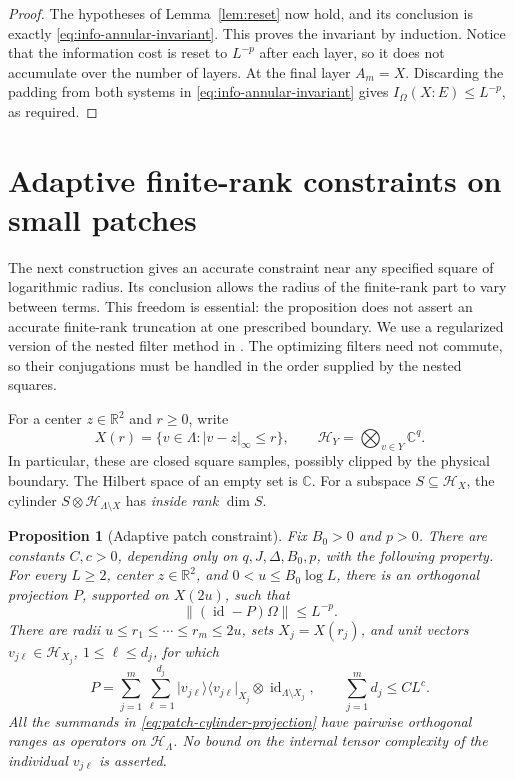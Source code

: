 \documentclass[11pt]{article}
\numberwithin{equation}{section}
\newtheorem{proposition}[theorem]{Proposition}
\theoremstyle{definition}
\theoremstyle{remark}
\DeclareMathOperator{\id}{id}
\newcommand{\norm}[1]{\lVert #1\rVert}
\newcommand{\abs}[1]{\lvert #1\rvert}
\begin{document}
\begin{proof}
The hypotheses of Lemma~\ref{lem:reset} now hold, and its conclusion
is exactly \eqref{eq:info-annular-invariant}.  This proves the invariant
by induction.  Notice that the information cost is reset to $L^{-p}$
after each layer, so it does not accumulate over the number of layers.
At the final layer $A_m=X$.  Discarding the padding from both systems
in \eqref{eq:info-annular-invariant} gives
$I_\Omega(X:E)\le L^{-p}$, as required.
\end{proof}

\section{Adaptive finite-rank constraints on small patches}
\label{sec:patches}

The next construction gives an accurate constraint near any specified
square of logarithmic radius.  Its conclusion allows the radius of the
finite-rank part to vary between terms.  This freedom is essential:
the proposition does not assert an accurate finite-rank truncation at
one prescribed boundary.  We use a regularized version of the nested
filter method in \cite{RepoAreaLaw}.  The optimizing filters need not
commute, so their conjugations must be handled in the order supplied by
the nested squares.

For a center \(z\in\mathbb R^2\) and \(r\geq 0\), write
\[
 X(r)=\{v\in\Lambda:\abs{v-z}_\infty\leq r\},
 \qquad
 \mathcal H_Y=\bigotimes_{v\in Y}\mathbb C^q.
\]
In particular, these are closed square samples, possibly clipped by the
physical boundary.  The Hilbert space of an empty set is \(\mathbb C\).
For a subspace $S\subseteq\mathcal H_X$, the cylinder
$S\otimes\mathcal H_{\Lambda\setminus X}$ has \emph{inside rank} $\dim S$.

\begin{proposition}[Adaptive patch constraint]
\label{prop:patch}
Fix \(B_0>0\) and \(p>0\).  There are constants \(C,c>0\), depending
only on \(q,J,\Delta,B_0,p\), with the following property.  For every
\(L\geq2\), center \(z\in\mathbb R^2\), and
\(0<u\leq B_0\log L\), there is an orthogonal projection \(P\),
supported on \(X(2u)\), such that
\[
 \norm{(\id-P)\Omega}\leq L^{-p}.
\]
There are radii \(u\leq r_1\leq\cdots\leq r_m\leq2u\), sets
\(X_j=X(r_j)\), and unit vectors
\(v_{j\ell}\in\mathcal H_{X_j}\), \(1\leq\ell\leq d_j\), for which
\begin{equation}
 P=\sum_{j=1}^m\sum_{\ell=1}^{d_j}
       \lvert v_{j\ell}\rangle\langle v_{j\ell}\rvert_{X_j}
          \otimes\id_{\Lambda\setminus X_j},
 \qquad
 \sum_{j=1}^m d_j\leq C L^c.
 \label{eq:patch-cylinder-projection}
\end{equation}
All the summands in \eqref{eq:patch-cylinder-projection} have pairwise
orthogonal ranges as operators on \(\mathcal H_\Lambda\).
No bound on the internal tensor complexity of the individual
\(v_{j\ell}\) is asserted.
\end{proposition}
\end{document}
